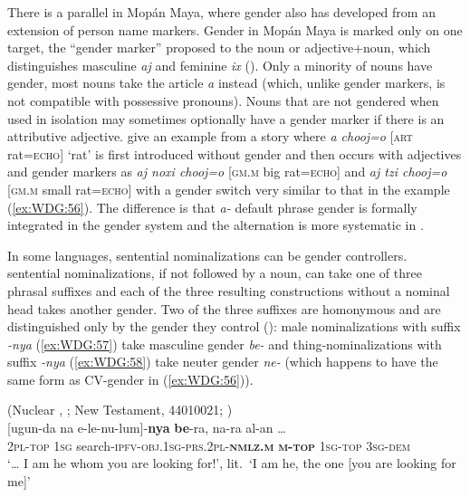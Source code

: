\documentclass[output=collectionpaper]{langsci/langscibook}
\begin{document}
There is a parallel in Mopán Maya, where gender also has developed from an extension of person name markers. Gender in Mopán Maya is marked only on one target, the ``gender marker'' proposed to the noun or adjective+noun, which distinguishes masculine \textit{aj} and feminine \textit{ix} (\citealt{Contini-Morava2018}). Only a minority of nouns have gender, most nouns take the article \textit{a} instead (which, unlike gender markers, is not compatible with possessive pronouns). Nouns that are not gendered when used in isolation may sometimes optionally have a gender marker if there is an attributive adjective. \cite[138]{Contini-Morava2018} give an example from a story where \textit{a ch\textquotesingle{}o\textquotesingle{}oj=o} [\textsc{art} rat=\textsc{echo}] `rat' is first introduced without gender and then occurs with adjectives and gender markers as \textit{aj noxi\textquotesingle{}  ch\textquotesingle{}o\textquotesingle{}oj=o} [\textsc{gm.m} big rat=\textsc{echo}] and \textit{aj tz\textquotesingle{}i\textquotesingle{} ch\textquotesingle{}o\textquotesingle{}oj=o} [\textsc{gm.m} small rat=\textsc{echo}] with a gender switch very similar to that in the  example (\ref{ex:WDG:56}). The difference is that  \textit{a-} default phrase gender is formally integrated in the gender system and the alternation is more systematic in .

\largerpage
In some languages, sentential nominalizations can be gender controllers.  sentential nominalizations, if not followed by a noun, can take one of three phrasal suffixes and each of the three resulting constructions without a nominal head takes another gender. Two of the three suffixes are homonymous and are distinguished only by the gender they control (\citealt{Waelchli2018}): male nominalizations with suffix \textit{-nya} (\ref{ex:WDG:57}) take masculine gender \textit{be-} and thing-nominalizations with suffix \textit{-nya} (\ref{ex:WDG:58}) take neuter gender \textit{ne-} (which happens to have the same form as CV-gender in (\ref{ex:WDG:56})).

\ea\label{ex:WDG:57}
 (Nuclear , ; New Testament, 44010021; \citealt[80]{Waelchli2018})\\
\gll {{\dots}} [ugun-da	na	e-le-nu-lum]-\textbf{nya}	\textbf{be}-ra,	na-ra	al-an {\dots}\\
{} \textsc{2pl-top}	\textsc{1sg}\footnotemark{} 	search-\textsc{ipfv-obj.1sg-prs.2pl-\textbf{nmlz.m}}	\textbf{\textsc{m-top}}	\textsc{1sg-top}	\textsc{3sg-dem} {}\\
\glt `{\dots} I am he whom you are looking for!', lit.\ `I am he, the one [you are looking for me]'\\
\z
%
\end{document}
